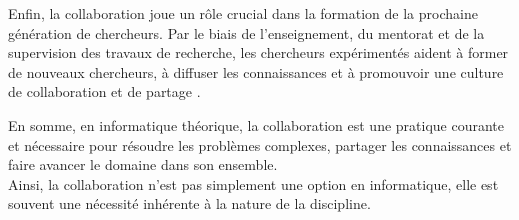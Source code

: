 Enfin, la collaboration joue un rôle crucial dans la formation de la prochaine génération de chercheurs. Par le biais de l'enseignement, du mentorat et de la supervision des travaux de recherche, les chercheurs expérimentés aident à former de nouveaux chercheurs, à diffuser les connaissances et à promouvoir une culture de collaboration et de partage \cite{long_cooperation_2008}.

En somme, en informatique théorique, la collaboration est une pratique courante et nécessaire pour résoudre les problèmes complexes, partager les connaissances et faire avancer le domaine dans son ensemble.\\

Ainsi, la collaboration n'est pas simplement une option en informatique, elle est souvent une nécessité inhérente à la nature de la discipline.

